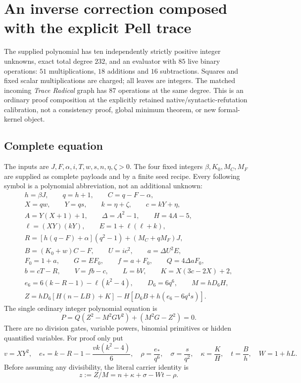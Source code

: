 \section{An inverse correction composed with the explicit Pell trace}
\label{sec:inverse-trace}
The supplied polynomial has ten independently strictly positive integer
unknowns, exact total degree $232$, and an evaluator with $85$ live binary
operations: $51$ multiplications, $18$ additions and $16$ subtractions.
Squares and fixed scalar multiplications are charged; all leaves are
integers.  The matched incoming \emph{Trace Radical} graph has $87$
operations at the same degree.  This is an ordinary proof composition at
the explicitly retained native/syntactic-refutation calibration, not a
consistency proof, global minimum theorem, or new formal-kernel object.

\subsection{Complete equation}
The inputs are $J,F,\alpha,i,T,w,s,n,\eta,\zeta>0$.  The four fixed
integers $\beta,K_0,M_C,M_F$ are supplied as complete payloads and by a
finite seed recipe.  Every following symbol is a polynomial abbreviation,
not an additional unknown:
\begin{gather*}
h=\beta J,\qquad q=h+1,\qquad C=q-F-\alpha,\\
X=qw,\qquad Y=qs,\qquad k=\eta+\zeta,\qquad c=kY+\eta,\\
A=Y(X+1)+1,\qquad \Delta=A^2-1,\qquad H=4A-5,\\
\ell=(XY)(kY),\qquad E=1+\ell(\ell+k),\\
R=[h(q-F)+\alpha](q^2-1)+(M_C+qM_F)J,\\
B=(K_0+w)C-F,\qquad U=ic^2,\qquad a=\Delta U^2E,\\
F_0=1+a,\qquad G=EF_0,\qquad f=a+F_0,\qquad Q=4\Delta aF_0,\\
b=cT-R,\qquad V=fb-c,\qquad L=bV,\qquad K=X(3c-2X)+2,\\
e_6=6(k-R-1)-\ell(k^2-4),\qquad D_6=6q^6,\qquad M=hD_6H,\\
Z=hD_6[H(n-LB)+K]-H[D_6B+h(e_6-6q^4s)].
\end{gather*}
The single ordinary integer polynomial equation is
\[
 \boxed{\quad P=Q(Z^2-M^2GV^2)+(M^2G-Z^2)=0.\quad}
\]
There are no division gates, variable powers, binomial primitives or
hidden quantified variables.  For proof only put
\[
v=XY^2,\quad e_*=k-R-1-\frac{vk(k^2-4)}6,\quad
\rho=\frac{e_*}{q^6},\quad \sigma=\frac{s}{q^2},\quad
\kappa=\frac KH,\quad t=\frac Bh,\quad W=1+hL.
\]
Before assuming any divisibility, the literal carrier identity is
\begin{equation}\label{eq:inverse-carrier}
 z:=Z/M=n+\kappa+\sigma-Wt-\rho.
\end{equation}

